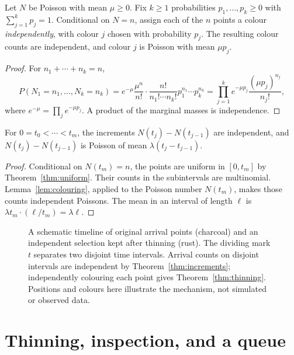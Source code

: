 \begin{lemma}[colouring]\label{lem:colouring}
Let $N$ be Poisson with mean $\mu\ge0$. Fix $k\ge1$ probabilities $p_1,\ldots,p_k\ge0$ with $\sum_{j=1}^k p_j=1$. Conditional on $N=n$, assign each of the $n$ points a colour \emph{independently}, with colour $j$ chosen with probability $p_j$. The resulting colour counts are independent, and colour $j$ is Poisson with mean $\mu p_j$.
\end{lemma}
\begin{proof}
For $n_1+\cdots+n_k=n$,
\[
 P(N_1=n_1,\ldots,N_k=n_k)
 =e^{-\mu}\frac{\mu^n}{n!}\cdot\frac{n!}{n_1!\cdots n_k!}p_1^{n_1}\cdots p_k^{n_k}
 =\prod_{j=1}^k e^{-\mu p_j}\frac{(\mu p_j)^{n_j}}{n_j!},
\]
where $e^{-\mu}=\prod_j e^{-\mu p_j}$. A product of the marginal masses is independence.
\end{proof}

\begin{theorem}\label{thm:increments}
For $0=t_0<\cdots<t_m$, the increments $N(t_j)-N(t_{j-1})$ are independent, and $N(t_j)-N(t_{j-1})$ is Poisson of mean $\lambda(t_j-t_{j-1})$.
\end{theorem}
\begin{proof}
Conditional on $N(t_m)=n$, the points are uniform in $[0,t_m]$ by Theorem~\ref{thm:uniform}. Their counts in the subintervals are multinomial. Lemma~\ref{lem:colouring}, applied to the Poisson number $N(t_m)$, makes those counts independent Poissons. The mean in an interval of length $\ell$ is $\lambda t_m\cdot(\ell/t_m)=\lambda\ell$.
\end{proof}

\begin{figure}[ht]
\centering
{}
\caption{A schematic timeline of original arrival points (charcoal) and an independent selection kept after thinning (rust). The dividing mark $t$ separates two disjoint time intervals. Arrival counts on disjoint intervals are independent by Theorem~\ref{thm:increments}; independently colouring each point gives Theorem~\ref{thm:thinning}. Positions and colours here illustrate the mechanism, not simulated or observed data.}
\label{fig:poissonclock}
\end{figure}

\section{Thinning, inspection, and a queue}

